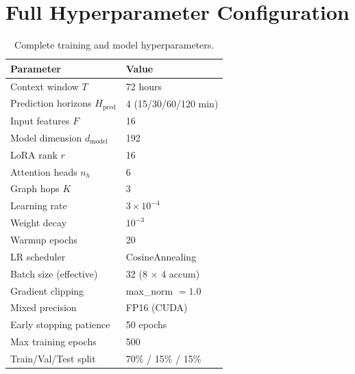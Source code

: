 \section{Full Hyperparameter Configuration}

\begin{table}[H]
\centering
\caption{Complete training and model hyperparameters.}
\label{Tab.A.1}
\begin{tabular}{ll}
\toprule
Parameter & Value \\
\midrule
Context window $T$ & 72 hours \\
Prediction horizons $H_{\text{pred}}$ & 4 (15/30/60/120 min) \\
Input features $F$ & 16 \\
Model dimension $d_{\text{model}}$ & 192 \\
LoRA rank $r$ & 16 \\
Attention heads $n_h$ & 6 \\
Graph hops $K$ & 3 \\
Learning rate & $3 \times 10^{-4}$ \\
Weight decay & $10^{-3}$ \\
Warmup epochs & 20 \\
LR scheduler & CosineAnnealing \\
Batch size (effective) & 32 (8 $\times$ 4 accum) \\
Gradient clipping & max\_norm $= 1.0$ \\
Mixed precision & FP16 (CUDA) \\
Early stopping patience & 50 epochs \\
Max training epochs & 500 \\
Train/Val/Test split & 70\% / 15\% / 15\% \\
\bottomrule
\end{tabular}
\end{table}
